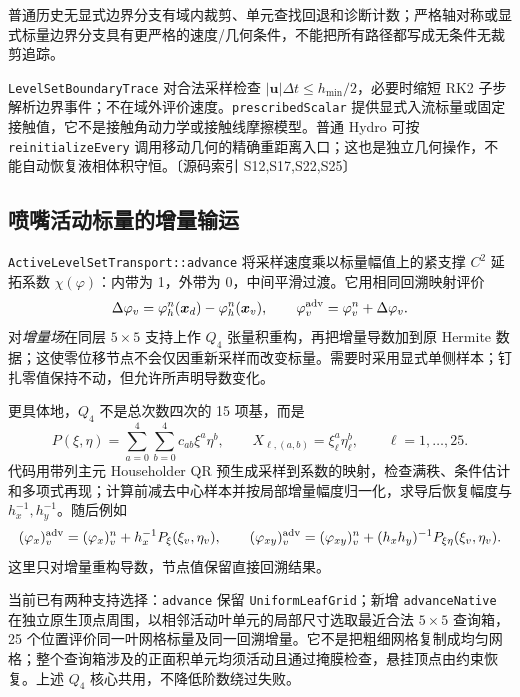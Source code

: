 \documentclass[UTF8,a4paper,11pt,fontset=fandol]{ctexart}
\newcommand{\code}[1]{\nolinkurl{#1}}
\newcommand{\src}[1]{\textcolor{ink}{\small〔源码索引 #1〕}}
\newcommand{\vel}{\bm{u}}
\newcommand{\dt}{\Delta t}
\begin{document}
普通历史无显式边界分支有域内裁剪、单元查找回退和诊断计数；严格轴对称或显式标量边界分支具有更严格的速度/几何条件，不能把所有路径都写成无条件无裁剪追踪。

\code{LevelSetBoundaryTrace} 对合法采样检查 $|\vel|\dt\le h_{\min}/2$，必要时缩短 RK2 子步解析边界事件；不在域外评价速度。\code{prescribedScalar} 提供显式入流标量或固定接触值，它不是接触角动力学或接触线摩擦模型。普通 Hydro 可按 \code{reinitializeEvery} 调用移动几何的精确重距离入口；这也是独立几何操作，不能自动恢复液相体积守恒。\src{S12,S17,S22,S25}

\subsection{喷嘴活动标量的增量输运}
\code{ActiveLevelSetTransport::advance} 将采样速度乘以标量幅值上的紧支撑 $C^2$ 延拓系数 $\chi(\varphi)$：内带为 1，外带为 0，中间平滑过渡。它用相同回溯映射评价
\begin{equation}
 \Delta\varphi_v=\varphi_h^n(\bm x_d)-\varphi_h^n(\bm x_v),\qquad
 \varphi_v^{\rm adv}=\varphi_v^n+\Delta\varphi_v.
\end{equation}
对\emph{增量场}在同层 $5\times5$ 支持上作 $Q_4$ 张量积重构，再把增量导数加到原 Hermite 数据；这使零位移节点不会仅因重新采样而改变标量。需要时采用显式单侧样本；钉扎零值保持不动，但允许所声明导数变化。

更具体地，$Q_4$ 不是总次数四次的 15 项基，而是
\begin{equation}
 P(\xi,\eta)=\sum_{a=0}^4\sum_{b=0}^4 c_{ab}\xi^a\eta^b,\qquad
 X_{\ell,(a,b)}=\xi_\ell^a\eta_\ell^b,\qquad \ell=1,\ldots,25.
\end{equation}
代码用带列主元 Householder QR 预生成采样到系数的映射，检查满秩、条件估计和多项式再现；计算前减去中心样本并按局部增量幅度归一化，求导后恢复幅度与 $h_x^{-1},h_y^{-1}$。随后例如
\begin{equation}
 (\varphi_x)_v^{\rm adv}=(\varphi_x)_v^n+h_x^{-1}P_\xi(\xi_v,\eta_v),\qquad
 (\varphi_{xy})_v^{\rm adv}=(\varphi_{xy})_v^n+(h_xh_y)^{-1}P_{\xi\eta}(\xi_v,\eta_v).
\end{equation}
这里只对增量重构导数，节点值保留直接回溯结果。

当前已有两种支持选择：\code{advance} 保留 \code{UniformLeafGrid}；新增 \code{advanceNative} 在独立原生顶点周围，以相邻活动叶单元的局部尺寸选取最近合法 $5\times5$ 查询箱，25 个位置评价同一叶网格标量及同一回溯增量。它不是把粗细网格复制成均匀网格；整个查询箱涉及的正面积单元均须活动且通过掩膜检查，悬挂顶点由约束恢复。上述 $Q_4$ 核心共用，不降低阶数绕过失败。
\end{document}
